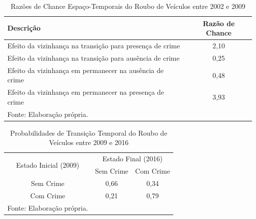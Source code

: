 \documentclass[12pt,openright,oneside,a4paper,english,french,spanish]{abntex2}
\numberwithin{table}{section} %
\numberwithin{figure}{section} %
\begin{document}
\begin{subappendices}
\begin{table}[H]
\centering
\caption{Razões de Chance Espaço-Temporais do Roubo de Veículos entre 2002 e 2009}
        \begin{tabular}{lc}
            \hline
            {\textbf{Descrição}} & {\textbf{Razão de Chance}} \\\hline
            {Efeito da vizinhança na transição para presença de crime} & {2,10} \\
            {Efeito da vizinhança na transição para ausência de crime} & {0,25} \\
            {Efeito da vizinhança em permanecer na ausência de crime} & {0,48} \\
            {Efeito da vizinhança em permanecer na presença de crime} & {3,93} \\\hline
            \tiny Fonte: Elaboração própria.
        \end{tabular}
    \label{tab:odds_espaco_tempo_roub_vei_2002_2009}
\end{table}














\begin{table}[H]
\centering
\caption{Probabilidades de Transição Temporal do Roubo de Veículos entre 2009 e 2016}
        \begin{tabular}{ccc}
            \hline
            \multirow{2}{*}{Estado Inicial (2009)} & \multicolumn{2}{c}{Estado Final (2016)}  \\\cline{2-3} 
                                     & \multicolumn{1}{l}{Sem Crime} & \multicolumn{1}{l}{Com Crime} \\\hline
            {Sem Crime} & {0,66} & {0,34} \\                \hline
            {Com Crime} & {0,21} & {0,79} \\                \hline
            \tiny Fonte: Elaboração própria.
        \end{tabular}
    \label{tab:prob_tempo_roub_vei_2009_2016}
\end{table}


\end{subappendices}
\end{document}

